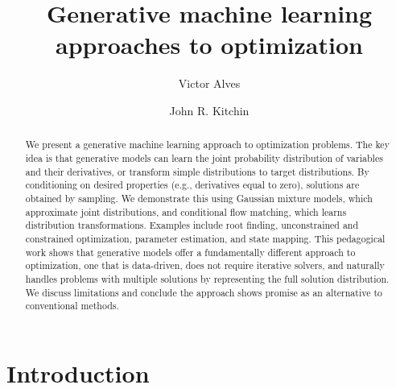 \documentclass{achemso}
\author{Victor Alves}
\author{John R. Kitchin}
\affiliation{Department of Chemical Engineering, Carnegie Mellon University, Pittsburgh, PA 15213}
\title{Generative machine learning approaches to optimization}
\begin{document}
\maketitle

\begin{abstract}
We present a generative machine learning approach to optimization problems. The key idea is that generative models can learn the joint probability distribution of variables and their derivatives, or transform simple distributions to target distributions. By conditioning on desired properties (e.g., derivatives equal to zero), solutions are obtained by sampling. We demonstrate this using Gaussian mixture models, which approximate joint distributions, and conditional flow matching, which learns distribution transformations. Examples include root finding, unconstrained and constrained optimization, parameter estimation, and state mapping. This pedagogical work shows that generative models offer a fundamentally different approach to optimization, one that is data-driven, does not require iterative solvers, and naturally handles problems with multiple solutions by representing the full solution distribution. We discuss limitations and conclude the approach shows promise as an alternative to conventional methods.
\end{abstract}

\section{Introduction}
\end{document}
